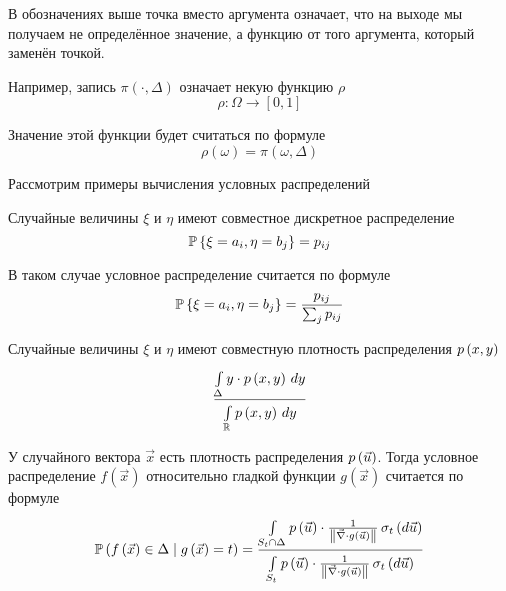 \begin{remark}
    В обозначениях выше точка вместо аргумента означает,
    что на выходе мы получаем не определённое значение,
    а функцию от того аргумента, который заменён точкой.

    Например, запись $\pi\left( \cdot, \Delta \right)$
    означает некую функцию $\rho$
        $$\rho: \Omega \rightarrow \left[ 0, 1 \right]$$

    Значение этой функции будет считаться по формуле
        $$\rho\left( \omega \right) = \pi\left( \omega, \Delta \right)$$
\end{remark}

Рассмотрим примеры вычисления условных распределений

\begin{example}
    Случайные величины $\xi$ и $\eta$ имеют совместное дискретное распределение
    $$\Probability{\xi = a_i, \eta = b_j} = p_{ij}$$

    В таком случае условное распределение считается по формуле
    $$\Probability{\xi = a_i, \eta = b_j} = \frac{p_{ij}}{\sum_j p_{ij}}$$
\end{example}

\begin{example}
    Случайные величины $\xi$ и $\eta$ имеют
    совместную плотность распределения $\pdf{x,y}$
        $$\frac{\integral{\Delta}{}{y}{y \cdot \pdf{x,y}}}
            {\integral{\mathbb{R}}{}{y}{\pdf{x,y}}}$$
\end{example}

\begin{example}
    У случайного вектора $\vec{x}$ есть плотность распределения $\pdf{\vec{u}}$.
    Тогда условное распределение $f\left( \vec{x} \right)$ относительно
    гладкой функции $g\left( \vec{x} \right)$ считается по формуле
    $$\probability{f\left( \vec{x} \right) \in \Delta
        \mcond g\left( \vec{x} \right) = t}
        = \frac{\integrall{S_t \cap \Delta}{\sigma_{t}\left(d\vec{u} \right)}{
            \pdf{\vec{u}} \cdot \frac{1}{
                \left\| \vec{\nabla} \cdot g\left( \vec{u} \right) \right\|}}}
            {\integrall{S_t}{\sigma_{t}\left(d\vec{u} \right)}{
                \pdf{\vec{u}} \cdot \frac{1}{
                    \left\| \vec{\nabla}
                        \cdot g\left( \vec{u} \right) \right\|}}}$$
\end{example}

